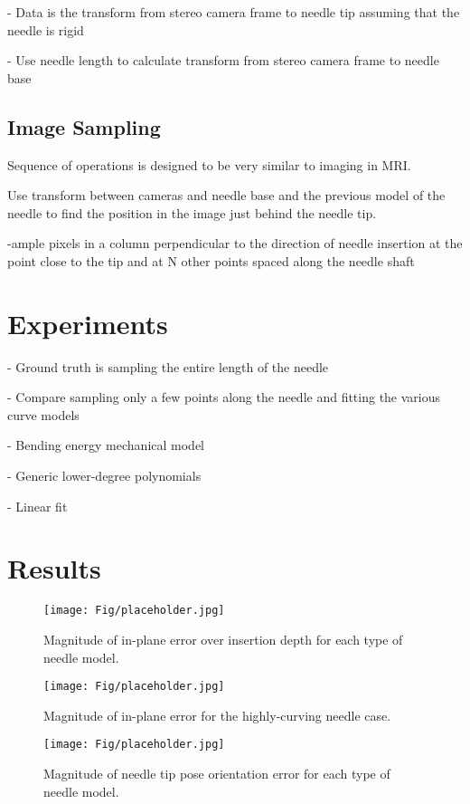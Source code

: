 - Data is the transform from stereo camera frame to needle tip assuming that the needle is rigid

- Use needle length to calculate transform from stereo camera frame to needle base


\subsection{Image Sampling}
Sequence of operations is designed to be very similar to imaging in MRI. 

Use transform between cameras and needle base and the previous model of the needle to find the position in the image just behind the needle tip.

-ample pixels in a column perpendicular to the direction of needle insertion at the point close to the tip and at N other points spaced along the needle shaft

\section{Experiments}
- Ground truth is sampling the entire length of the needle

- Compare sampling only a few points along the needle and fitting the various curve models

- Bending energy mechanical model

- Generic lower-degree polynomials

- Linear fit

\section{Results}
\begin{figure}[h]
\texttt{[image: Fig/placeholder.jpg]}
\caption{Magnitude of in-plane error over insertion depth for each type of needle model.}
\label{fig:results_error}
\end{figure}

\begin{figure}[h]
\texttt{[image: Fig/placeholder.jpg]}
\caption{Magnitude of in-plane error for the highly-curving needle case.}
\label{fig:pose_error}
\end{figure}

\begin{figure}[h]
\texttt{[image: Fig/placeholder.jpg]}
\caption{Magnitude of needle tip pose orientation error for each type of needle model.}
\label{fig:pose_error}
\end{figure}


